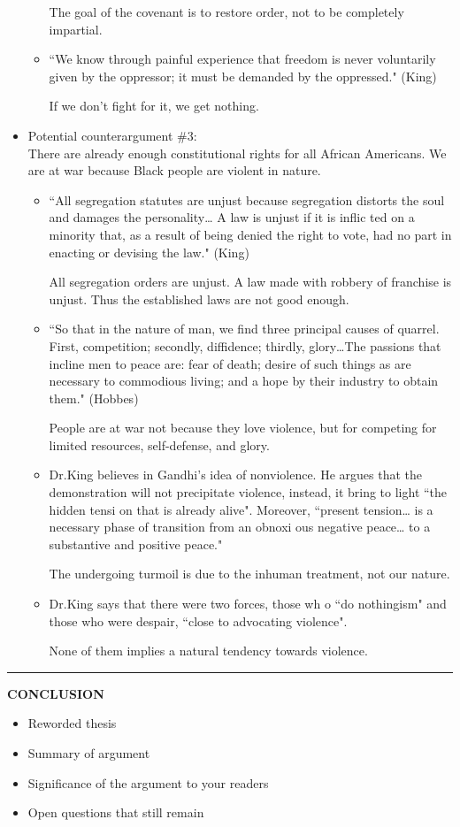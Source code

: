 \documentclass{article}
\begin{document}
\begin{paracol}{3}
\begin{itemize}
\begin{itemize}
        The goal of the covenant is to restore order, not to be completely impartial.
\item “We know through painful experience that
 freedom is never voluntarily
given by the oppressor; it must be demanded by the oppressed." (King)

If we don’t fight for it, we get nothing. 
		\end{itemize}
	\item Potential counterargument \#3:\\
		There are already enough constitutional rights for all African Americans. We are at war because Black people are violent in nature.
		\begin{itemize}
			\item “All segregation statutes are
unjust because segregation distorts the soul and damages the personality… A law is unjust if it is inflic
ted on a minority that, as a result of being denied the right to vote, had no part in enacting or devising the law." (King)

All segregation orders are unjust. A law made with robbery of franchise is unjust. Thus the established laws are not good enough.
\item  ``So that in the nature of man, we find three principal causes of quarrel. First, competition; secondly, diffidence; thirdly, glory\ldots The passions that incline men to peace are: fear of death; desire of such things as are necessary to commodious living; and a hope by their industry to obtain them." (Hobbes)

        People are at war not because they love violence, but for competing for limited resources, self-defense, and glory.
\item Dr.King believes in Gandhi’s idea of nonviolence.
 He argues that the demonstration will not precipitate violence, instead, it bring to light “the hidden tensi
on that is already alive". Moreover, “present tension…
 is a necessary phase of transition from an obnoxi
ous negative peace… to a substantive and positive
peace."

The undergoing turmoil is due to the inhuman treatment, not our nature.
\item Dr.King says that there were two forces, those wh
o “do nothingism" and those who were despair, “close
to advocating violence".

        None of them implies a natural tendency towards violence.
		\end{itemize}
\end{itemize}
\end{paracol}
\noindent\rule{16cm}{0.4pt}

\begin{paracol}{3}
	\switchcolumn[0]
	\noindent \textbf{CONCLUSION}
	\switchcolumn[2]
\begin{itemize}
	\item Reworded thesis
	\item Summary of argument
	\item Significance of the argument to your readers
	\item Open questions that still remain
\end{itemize}
\end{paracol}
\end{document}
